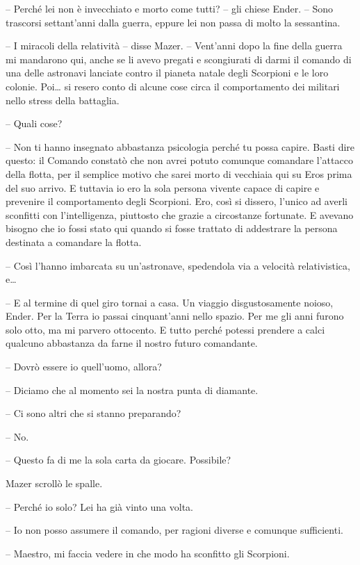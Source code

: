 {-- Perché lei non è invecchiato e morto come tutti? -- gli chiese
	Ender. -- Sono trascorsi settant'anni dalla guerra, eppure lei non passa
	di molto la sessantina.}

{-- I miracoli della relatività -- disse Mazer. -- Vent'anni dopo la
	fine della guerra mi mandarono qui, anche se li avevo pregati e
	scongiurati di darmi il comando di una delle astronavi lanciate contro
	il pianeta natale degli Scorpioni e le loro colonie. Poi\ldots{} si
	resero conto di alcune cose circa il comportamento dei militari nello
	stress della battaglia.}

{-- Quali cose?}

{-- Non ti hanno insegnato abbastanza psicologia perché tu possa capire.
	Basti dire questo: il Comando constatò che non avrei potuto comunque
	comandare l'attacco della flotta, per il semplice motivo che sarei morto
	di vecchiaia qui su Eros prima del suo arrivo. E tuttavia io ero la sola
	persona vivente capace di capire e prevenire il comportamento degli
	Scorpioni. Ero, così si dissero, l'unico ad averli sconfitti con
	l'intelligenza, piuttosto che grazie a circostanze fortunate. E avevano
	bisogno che io fossi stato qui quando si fosse trattato di addestrare la
	persona destinata a comandare la flotta.}

{-- Così l'hanno imbarcata su un'astronave, spedendola via a velocità
	relativistica, e\ldots{}}

{-- E al termine di quel giro tornai a casa. Un viaggio disgustosamente
	noioso, Ender. Per la Terra io passai cinquant'anni nello spazio. Per me
	gli anni furono solo otto, ma mi parvero ottocento. E tutto perché
	potessi prendere a calci qualcuno abbastanza da farne il nostro futuro
	comandante.}

{-- Dovrò essere io quell'uomo, allora?}

{-- Diciamo che al momento sei la nostra punta di diamante.}

{-- Ci sono altri che si stanno preparando?}

{-- No.}

{-- Questo fa di me la sola carta da giocare. Possibile?}

{Mazer scrollò le spalle.}

{-- Perché io solo? Lei ha già vinto una volta.}

{-- Io non posso assumere il comando, per ragioni diverse e comunque
	sufficienti.}

{-- Maestro, mi faccia vedere in che modo ha sconfitto gli Scorpioni.}

